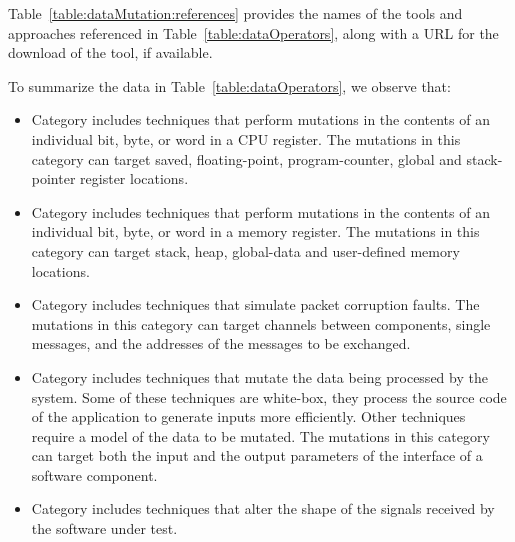 \newcommand{\FTAPE}{\cite{tsai1999stress}}
\newcommand{\FIAT}{\cite{barton1990fault}}
\newcommand{\GOOFI}{\cite{aidemark2001goofi}}
\newcommand{\DOCTOR}{\cite{han1995doctor}}
\newcommand{\ORCHESTRA}{\cite{dawson1996testing}}
\newcommand{\Fuzz}{\cite{miller1995fuzz}}
\newcommand{\Ballista}{\cite{koopman2000exception}}
\newcommand{\RIDDLE}{\cite{ghosh1998testing}}
\newcommand{\Superion}{\cite{Wang:GrammarAwareFuzzying:ICSE:2019}}
\newcommand{\AFL}{\cite{gutmann2016fuzzing}}
\newcommand{\SAGE}{\cite{godefroid2012sage}}
\newcommand{\pFuzzer}{\cite{mathis2019parser}} 
\newcommand{\MoWF}{\cite{pham2016model}}
\newcommand{\DiNardoICST}{\cite{di2015generating}}
\newcommand{\DiNardoASE}{\cite{di2015evolutionary}}
\newcommand{\Matinnejad}{\cite{Matinnejad19}}
\newcommand{\MongoDB}{\cite{Guo:MongoDBFuzzer:CACM:2017}}
\newcommand{\SOLMI}{\cite{Jan:ISSTA:2016}}
\newcommand{\MUSQL}{\cite{Appelt:SQLI:ISSTA:2014}}

Table~\ref{table:dataMutation:references} provides the names of the tools and approaches referenced in Table~\ref{table:dataOperators}, along with a URL for the download of the tool, if available.





To summarize the data in Table~\ref{table:dataOperators}, we observe that:
\begin{itemize}
	\item Category  includes techniques that perform mutations in the contents of an individual bit, byte, or word in a CPU register. The mutations in this category can target saved, floating-point, program-counter, global and stack-pointer register locations. 
	\item Category  includes techniques that perform mutations in the contents of an individual bit, byte, or word in a memory register. The mutations in this category can target stack, heap, global-data and user-defined memory locations.
	\item Category  includes techniques that simulate packet corruption faults. The mutations in this category can target channels between components, single messages, and the addresses of the messages to be exchanged.
	\item Category  includes techniques that mutate the data being processed by the system. Some of these techniques are white-box, they process the source code of the application to generate inputs more efficiently. Other techniques require a model of the data to be mutated. The mutations in this category can target both the input and the output parameters of the interface of a software component.
	\item Category  includes techniques that alter the shape of the signals received by the software under test.
\end{itemize}

